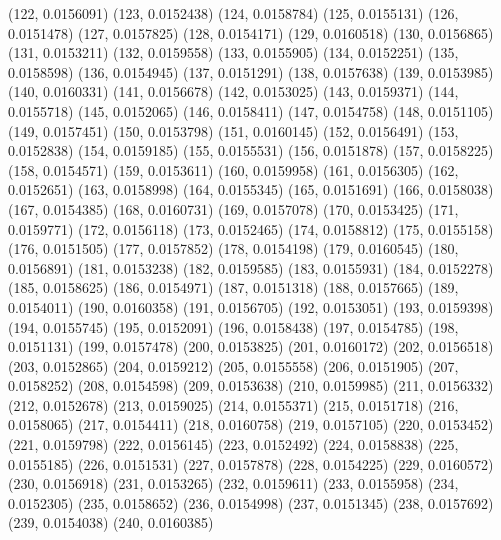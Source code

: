 {					(122, 0.0156091)
					(123, 0.0152438)
					(124, 0.0158784)
					(125, 0.0155131)
					(126, 0.0151478)
					(127, 0.0157825)
					(128, 0.0154171)
					(129, 0.0160518)
					(130, 0.0156865)
					(131, 0.0153211)
					(132, 0.0159558)
					(133, 0.0155905)
					(134, 0.0152251)
					(135, 0.0158598)
					(136, 0.0154945)
					(137, 0.0151291)
					(138, 0.0157638)
					(139, 0.0153985)
					(140, 0.0160331)
					(141, 0.0156678)
					(142, 0.0153025)
					(143, 0.0159371)
					(144, 0.0155718)
					(145, 0.0152065)
					(146, 0.0158411)
					(147, 0.0154758)
					(148, 0.0151105)
					(149, 0.0157451)
					(150, 0.0153798)
					(151, 0.0160145)
					(152, 0.0156491)
					(153, 0.0152838)
					(154, 0.0159185)
					(155, 0.0155531)
					(156, 0.0151878)
					(157, 0.0158225)
					(158, 0.0154571)
					(159, 0.0153611)
					(160, 0.0159958)
					(161, 0.0156305)
					(162, 0.0152651)
					(163, 0.0158998)
					(164, 0.0155345)
					(165, 0.0151691)
					(166, 0.0158038)
					(167, 0.0154385)
					(168, 0.0160731)
					(169, 0.0157078)
					(170, 0.0153425)
					(171, 0.0159771)
					(172, 0.0156118)
					(173, 0.0152465)
					(174, 0.0158812)
					(175, 0.0155158)
					(176, 0.0151505)
					(177, 0.0157852)
					(178, 0.0154198)
					(179, 0.0160545)
					(180, 0.0156891)
					(181, 0.0153238)
					(182, 0.0159585)
					(183, 0.0155931)
					(184, 0.0152278)
					(185, 0.0158625)
					(186, 0.0154971)
					(187, 0.0151318)
					(188, 0.0157665)
					(189, 0.0154011)
					(190, 0.0160358)
					(191, 0.0156705)
					(192, 0.0153051)
					(193, 0.0159398)
					(194, 0.0155745)
					(195, 0.0152091)
					(196, 0.0158438)
					(197, 0.0154785)
					(198, 0.0151131)
					(199, 0.0157478)
					(200, 0.0153825)
					(201, 0.0160172)
					(202, 0.0156518)
					(203, 0.0152865)
					(204, 0.0159212)
					(205, 0.0155558)
					(206, 0.0151905)
					(207, 0.0158252)
					(208, 0.0154598)
					(209, 0.0153638)
					(210, 0.0159985)
					(211, 0.0156332)
					(212, 0.0152678)
					(213, 0.0159025)
					(214, 0.0155371)
					(215, 0.0151718)
					(216, 0.0158065)
					(217, 0.0154411)
					(218, 0.0160758)
					(219, 0.0157105)
					(220, 0.0153452)
					(221, 0.0159798)
					(222, 0.0156145)
					(223, 0.0152492)
					(224, 0.0158838)
					(225, 0.0155185)
					(226, 0.0151531)
					(227, 0.0157878)
					(228, 0.0154225)
					(229, 0.0160572)
					(230, 0.0156918)
					(231, 0.0153265)
					(232, 0.0159611)
					(233, 0.0155958)
					(234, 0.0152305)
					(235, 0.0158652)
					(236, 0.0154998)
					(237, 0.0151345)
					(238, 0.0157692)
					(239, 0.0154038)
					(240, 0.0160385)
}
